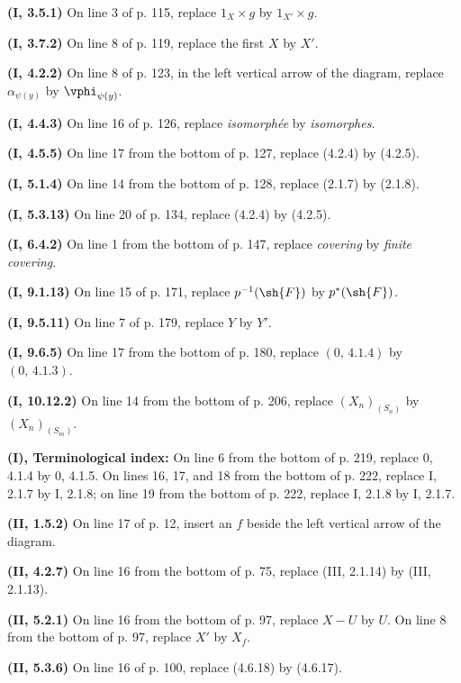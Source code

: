 \noindent\textbf{(I, 3.5.1)} On line 3 of p. 115, replace $1_X\times g$ by
$1_{X'}\times g$.

\noindent\textbf{(I, 3.7.2)} On line 8 of p. 119, replace the first $X$ by
$X'$.

\noindent\textbf{(I, 4.2.2)} On line 8 of p. 123, in the left vertical arrow
of the diagram, replace $\alpha_{\psi(y)}$ by $\vphi_{\psi(y)}$.

\noindent\textbf{(I, 4.4.3)} On line 16 of p. 126, replace \emph{isomorphée}
by \emph{isomorphes}.

\noindent\textbf{(I, 4.5.5)} On line 17 from the bottom of p. 127, replace
(4.2.4) by (4.2.5).

\noindent\textbf{(I, 5.1.4)} On line 14 from the bottom of p. 128, replace
(2.1.7) by (2.1.8).

\noindent\textbf{(I, 5.3.13)} On line 20 of p. 134, replace (4.2.4) by
(4.2.5).

\noindent\textbf{(I, 6.4.2)} On line 1 from the bottom of p. 147, replace
\emph{covering} by \emph{finite covering}.

\noindent\textbf{(I, 9.1.13)} On line 15 of p. 171, replace
$p^{-1}(\sh{F})$ by $p^*(\sh{F})$.

\noindent\textbf{(I, 9.5.11)} On line 7 of p. 179, replace $Y$ by $Y'$.

\noindent\textbf{(I, 9.6.5)} On line 17 from the bottom of p. 180, replace
$(0,\,4.1.4)$ by $(0,\,4.1.3)$.

\noindent\textbf{(I, 10.12.2)} On line 14 from the bottom of p. 206, replace
$(X_n)_{(S_n)}$ by $(X_n)_{(S_m)}$.

\clearpage
{}
\noindent\textbf{(I), Terminological index:} On line 6 from the bottom of p.
219, replace 0, 4.1.4 by 0, 4.1.5. On lines 16, 17, and 18 from the bottom of
p. 222, replace I, 2.1.7 by I, 2.1.8; on line 19 from the bottom of p. 222,
replace I, 2.1.8 by I, 2.1.7.

\noindent\textbf{(II, 1.5.2)} On line 17 of p. 12, insert an $f$ beside the
left vertical arrow of the diagram.

\noindent\textbf{(II, 4.2.7)} On line 16 from the bottom of p. 75, replace
(III, 2.1.14) by (III, 2.1.13).

\noindent\textbf{(II, 5.2.1)} On line 16 from the bottom of p. 97, replace
$X-U$ by $U$. On line 8 from the bottom of p. 97, replace $X'$ by $X_f$.

\noindent\textbf{(II, 5.3.6)} On line 16 of p. 100, replace (4.6.18) by
(4.6.17).

